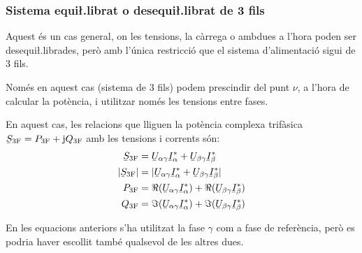 \subsubsection{Sistema equi{\l.l}ibrat o desequi{\l.l}ibrat de 3 fils}

Aquest \'{e}s un cas  general, on les tensions, la c\`{a}rrega o ambdues a
l'hora  poden ser desequi{\l.l}ibrades, per\`{o} amb l'\'{u}nica restricci\'{o} que
el sistema d'alimentaci\'{o} sigui de 3 fils.

 Nom\'{e}s en aquest cas (sistema de 3 fils) podem prescindir del punt $\nu$, a l'hora de
calcular la pot\`{e}ncia, i utilitzar nom\'{e}s les tensions entre fases.

En aquest cas, les relacions que lliguen la pot\`{e}ncia complexa
trif\`{a}sica $\cmplx{S}\ped{3F} = P\ped{3F} + \ju Q\ped{3F}$ amb les
tensions i corrents s\'{o}n:
\begin{align}
    \cmplx{S}\ped{3F} &= \cmplx{U}_{\alpha\gamma} \cmplx{I}_\alpha^*
     +  \cmplx{U}_{\beta\gamma} \cmplx{I}_\beta^*  \label{eq:s_3f_3fils}\\
    |\cmplx{S}\ped{3F}| &= |\cmplx{U}_{\alpha\gamma} \cmplx{I}_\alpha^* +
    \cmplx{U}_{\beta\gamma} \cmplx{I}_\beta^*| \\
    P\ped{3F} &= \Re(\cmplx{U}_{\alpha\gamma} \cmplx{I}_\alpha^*) +
    \Re(\cmplx{U}_{\beta\gamma} \cmplx{I}_\beta^*) \\
    Q\ped{3F} &= \Im(\cmplx{U}_{\alpha\gamma} \cmplx{I}_\alpha^*) +
    \Im(\cmplx{U}_{\beta\gamma} \cmplx{I}_\beta^*)
\end{align}

En les equacions anteriors s'ha utilitzat la fase $\gamma$ com a
fase de refer\`{e}ncia, per\`{o} es podria haver escollit tamb\'{e} qualsevol de
les altres dues.


